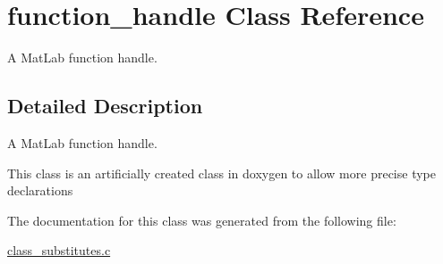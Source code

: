 \hypertarget{a00006}{\section{function\-\_\-handle Class Reference}
\label{a00006}
}


A Mat\-Lab function handle.  




\subsection{Detailed Description}
A Mat\-Lab function handle. 

This class is an artificially created class in doxygen to allow more precise type declarations 

The documentation for this class was generated from the following file\-:\begin{DoxyCompactItemize}
\item 
\hyperlink{a00016}{class\-\_\-substitutes.\-c}\end{DoxyCompactItemize}

